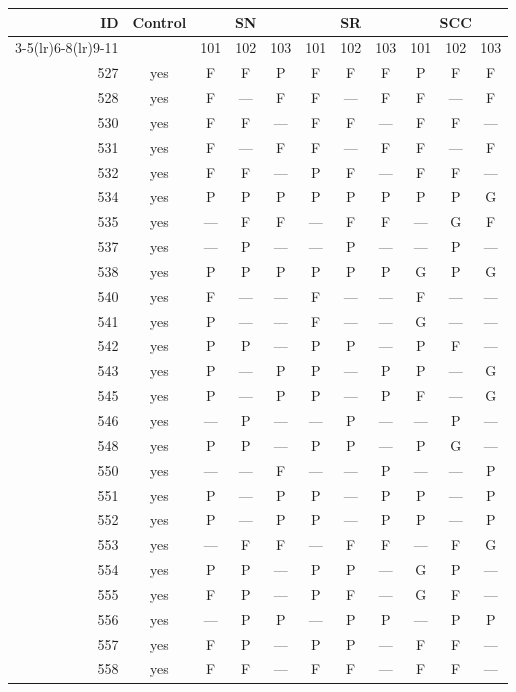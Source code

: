 \begin{table}[p]\centering\small
\begin{tabular*}{\textwidth}{@{\extracolsep{\fill}}rc*{9}{c}@{}}\toprule
ID & Control & \multicolumn{3}{c}{SN} & \multicolumn{3}{c}{SR} & \multicolumn{3}{c}{SCC}\\
\cmidrule(lr){3-5}\cmidrule(lr){6-8}\cmidrule(lr){9-11}
 & & 101 & 102 & 103 & 101 & 102 & 103 & 101 & 102 & 103\\\midrule
527 & yes & F & F & P & F & F & F & P & F & F\\
528 & yes & F & — & F & F & — & F & F & — & F\\
530 & yes & F & F & — & F & F & — & F & F & —\\
531 & yes & F & — & F & F & — & F & F & — & F\\
532 & yes & F & F & — & P & F & — & F & F & —\\
534 & yes & P & P & P & P & P & P & P & P & G\\
535 & yes & — & F & F & — & F & F & — & G & F\\
537 & yes & — & P & — & — & P & — & — & P & —\\
538 & yes & P & P & P & P & P & P & G & P & G\\
540 & yes & F & — & — & F & — & — & F & — & —\\
541 & yes & P & — & — & F & — & — & G & — & —\\
542 & yes & P & P & — & P & P & — & P & F & —\\
543 & yes & P & — & P & P & — & P & P & — & G\\
545 & yes & P & — & P & P & — & P & F & — & G\\
546 & yes & — & P & — & — & P & — & — & P & —\\
548 & yes & P & P & — & P & P & — & P & G & —\\
550 & yes & — & — & F & — & — & P & — & — & P\\
551 & yes & P & — & P & P & — & P & P & — & P\\
552 & yes & P & — & P & P & — & P & P & — & P\\
553 & yes & — & F & F & — & F & F & — & F & G\\
554 & yes & P & P & — & P & P & — & G & P & —\\
555 & yes & F & P & — & P & F & — & G & F & —\\
556 & yes & — & P & P & — & P & P & — & P & P\\
557 & yes & F & P & — & P & P & — & F & F & —\\
558 & yes & F & F & — & F & F & — & F & F & —\\

\end{tabular*}
\end{table}
